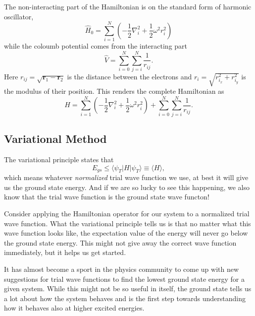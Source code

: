 \documentclass[aps,prb,twocolumn,floatfix]{revtex4}
\renewcommand{\vec}{\mathbf}
\begin{document}
The non-interacting part of the Hamiltonian is on the standard form of harmonic oscillator,
\begin{equation}
    \hat H_0 = \sum_{i=1}^{N} \left( - \frac{1}{2} \nabla_{i}^{2} + \frac{1}{2} \omega^{2} r_{i}^{2} \right)
\end{equation}
while the coloumb potential comes from the interacting part
\begin{equation}
    \hat V = \sum_{i=0}^{N} \sum_{j=i}^{N} \frac{1}{r_{ij}}.
\end{equation}
Here $r_{ij} = \sqrt{\vec{r}_1 - \vec{r}_2}$ is the distance between the electrons and $r_i = \sqrt{r_{i_{x}}^{2} + r_{i_{y}}^{2}}$ is the modulus of their position. This renders the complete Hamiltonian as
\begin{equation}
    \hat H = \sum_{i=1}^{N} \left( - \frac{1}{2} \nabla_{i}^{2} + \frac{1}{2} \omega^{2} r_{i}^{2} \right) + \sum_{i=0}^{N} \sum_{j=i}^{N} \frac{1}{r_{ij}}. \label{eq:hamiltonian}
\end{equation}

\subsection{Variational Method}\label{sec:varmethods}

The variational principle states that
\begin{equation}
    E_{gs} \leq \langle \psi_T | H | \psi_T \rangle \equiv \langle H \rangle,
\end{equation}
which means whatever \emph{normalized} trial wave function we use, at best it will give us the ground state energy. And if we are so lucky to see this happening, we also know that the trial wave function is the ground state wave functon!

Consider applying the Hamiltonian operator for our system to a normalized trial wave function. What the variational principle tells us is that no matter what this wave function looks like, the expectation value of the energy will never go below the ground state energy. This might not give away the correct wave function immediately, but it helps us get started.

It has almost become a sport in the physics community to come up with new suggestions for trial wave functions to find the lowest ground state energy for a given system. While this might not be so useful in itself, the ground state tells us a lot about how the system behaves and is the first step towards understanding how it behaves also at higher excited energies. %
\end{document}
